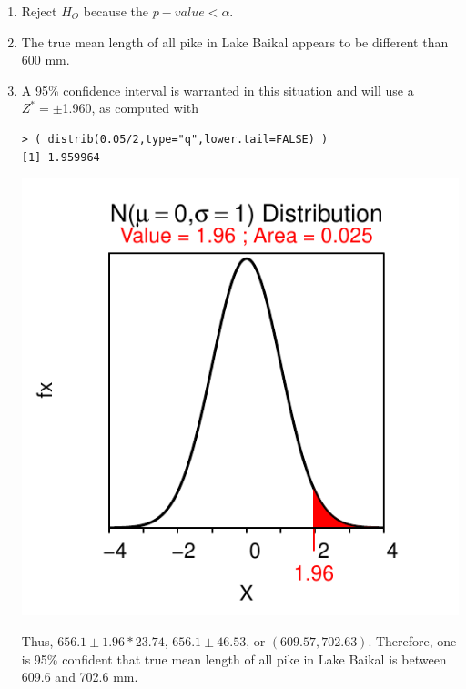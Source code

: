 \documentclass[10pt,openany]{book}\usepackage[]{graphicx}\usepackage[]{color}
\makeatletter
\newenvironment{kframe}{%
 \def\at@end@of@kframe{}%
 \ifinner\ifhmode%
  \def\at@end@of@kframe{\end{minipage}}%
  \begin{minipage}{\columnwidth}%
 \fi\fi%
 \def\FrameCommand##1{\hskip\@totalleftmargin \hskip-\fboxsep
 \colorbox{shadecolor}{##1}\hskip-\fboxsep
     \hskip-\linewidth \hskip-\@totalleftmargin \hskip\columnwidth}%
 \MakeFramed {\advance\hsize-\width
   \@totalleftmargin\z@ \linewidth\hsize
   \@setminipage}}%
 {\par\unskip\endMakeFramed%
 \at@end@of@kframe}
\newenvironment{knitrout}{}{} %
\makeatother
\begin{document}
\begin{itemize}
\begin{enumerate}
\begin{knitrout}
{}



\end{knitrout}
      \item Reject $H_{O}$ because the $p-value<\alpha$.
      \item The true mean length of all pike in Lake Baikal appears to be different than 600 mm.
      \item A 95\% confidence interval is warranted in this situation and will use a $Z^{*}=\pm$1.960, as computed with
\begin{knitrout}
\color{fgcolor}\begin{kframe}
\begin{verbatim}
> ( distrib(0.05/2,type="q",lower.tail=FALSE) )
[1] 1.959964
\end{verbatim}
\end{kframe}

{\centering \includegraphics[width=.4\linewidth]{Figs/unnamed-chunk-349-1} 

}



\end{knitrout}
Thus, $656.1\pm1.96*23.74$, $656.1\pm46.53$, or $(609.57, 702.63)$.  Therefore, one is 95\% confident that true mean length of all pike in Lake Baikal is between 609.6 and 702.6 mm.
    \end{enumerate}


\end{itemize}
\end{document}

